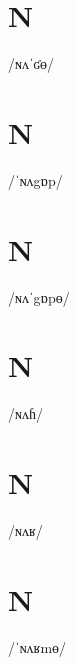 \documentclass[10pt,a4paper,twoside]{book}
\begin{document}
\section*{N}

\begin{multicols}{3}
 {/ɴʌˈʛɵ/} {}
\end{multicols}

\section*{N}

\begin{multicols}{3}
 {/ˈɴʌgɒp/} {}
\end{multicols}

\section*{N}

\begin{multicols}{3}
 {/ɴʌˈgɒpɵ/} {}
\end{multicols}

\section*{N}

\begin{multicols}{3}
 {/ɴʌɦ/} {}
\end{multicols}

\section*{N}

\begin{multicols}{3}
 {/ɴʌʁ/} {}
\end{multicols}

\section*{N}

\begin{multicols}{3}
 {/ˈɴʌʁmɵ/} {}
\end{multicols}
\end{document}
